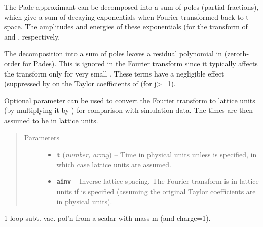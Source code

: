 \documentclass[letterpaper,10pt,english]{sphinxmanual}
\begin{document}
\begin{fulllineitems}
\begin{fulllineitems}
The Pade approximant can be decomposed into a sum of poles (partial
fractions), which give a sum of decaying exponentials when Fourier
transformed back to t-space. The amplitudes and energies of these
exponentials (for the transform of  and , respectively.

The decomposition into a sum of poles leaves a residual polynomial in
 (zeroth-order for  Pades). This is ignored in the
Fourier transform since it typically affects the transform only for
very small . These terms have a negligible effect (suppressed by
 on the Taylor coefficients  of 
(for j\textgreater{}=1).

Optional parameter  can be used to convert the Fourier
transform to lattice units (by multiplying it by ) for
comparison with simulation data. The times  are then
assumed to be in lattice units.
\begin{quote}\begin{description}
\item[{Parameters}] \leavevmode\begin{itemize}
\item {} 
\textbf{\texttt{t}} (\emph{number, array}) -- Time in physical units unless 
is specified, in which case lattice units are assumed.

\item {} 
\textbf{\texttt{ainv}} -- Inverse lattice spacing. The Fourier transform is in lattice
units if  is specified (assuming the original
Taylor coefficients are in physical units).

\end{itemize}

\end{description}\end{quote}

\end{fulllineitems}


\begin{fulllineitems}
\label{g2tools:g2tools.vacpol.scalar}
1-loop subt. vac. pol'n from a scalar with mass m (and charge=1).

\end{fulllineitems}


\end{fulllineitems}
\end{document}
